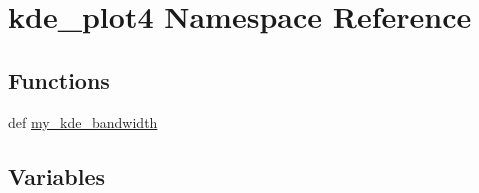 \hypertarget{namespacekde__plot4}{}\section{kde\+\_\+plot4 Namespace Reference}
\label{namespacekde__plot4}
\subsection*{Functions}
\begin{DoxyCompactItemize}
\item 
def \hyperlink{namespacekde__plot4_a907cf90ce6515ae18c2bd01c3f347e8b}{my\+\_\+kde\+\_\+bandwidth}
\end{DoxyCompactItemize}
\subsection*{Variables}
